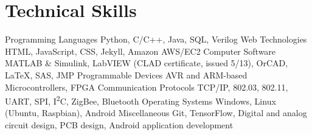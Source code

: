 \section{Technical Skills}
\begin{cvskills}
  \cvskill
    {Programming Languages}
    {Python, C/C++, Java, SQL, Verilog}
  \cvskill
    {Web Technologies}
    {HTML, JavaScript, CSS, Jekyll, Amazon AWS/EC2}
  \cvskill
    {Computer Software}
    {MATLAB \& Simulink, LabVIEW (CLAD certificate, issued 5/13), OrCAD, \LaTeX, SAS, JMP}
  \cvskill
    {Programmable Devices}
    {AVR and ARM-based Microcontrollers, FPGA}
  \cvskill
    {Communication Protocols}
    {TCP/IP, 802.03, 802.11, UART, SPI, I\textsuperscript{2}C, ZigBee, Bluetooth}
  \cvskill
    {Operating Systems}
    {Windows, Linux (Ubuntu, Raspbian), Android}
  \cvskill
    {Miscellaneous}
    {Git, TensorFlow, Digital and analog circuit design, PCB design, Android application development}
\end{cvskills} 